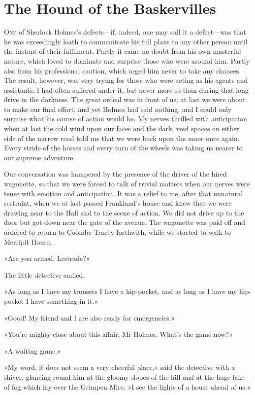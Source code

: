 \chapter{The Hound of the Baskervilles}
\lettrine[lines=4]{O}{ne} of Sherlock Holmes's defects—if, indeed, one may call it a defect—was that he was exceedingly loath to communicate his full plans to any other person until the instant of their fulfilment. Partly it came no doubt from his own masterful nature, which loved to dominate and surprise those who were around him. Partly also from his professional caution, which urged him never to take any chances. The result, however, was very trying for those who were acting as his agents and assistants. I had often suffered under it, but never more so than during that long drive in the darkness. The great ordeal was in front of us; at last we were about to make our final effort, and yet Holmes had said nothing, and I could only surmise what his course of action would be. My nerves thrilled with anticipation when at last the cold wind upon our faces and the dark, void spaces on either side of the narrow road told me that we were back upon the moor once again. Every stride of the horses and every turn of the wheels was taking us nearer to our supreme adventure.

Our conversation was hampered by the presence of the driver of the hired wagonette, so that we were forced to talk of trivial matters when our nerves were tense with emotion and anticipation. It was a relief to me, after that unnatural restraint, when we at last passed Frankland's house and knew that we were drawing near to the Hall and to the scene of action. We did not drive up to the door but got down near the gate of the avenue. The wagonette was paid off and ordered to return to Coombe Tracey forthwith, while we started to walk to Merripit House.

»Are you armed, Lestrade?«

The little detective smiled.

»As long as I have my trousers I have a hip-pocket, and as long as I have my hip-pocket I have something in it.«

»Good! My friend and I are also ready for emergencies.«

»You're mighty close about this affair, Mr Holmes. What's the game now?«

»A waiting game.«

»My word, it does not seem a very cheerful place,« said the detective with a shiver, glancing round him at the gloomy slopes of the hill and at the huge lake of fog which lay over the Grimpen Mire. »I see the lights of a house ahead of us.«

